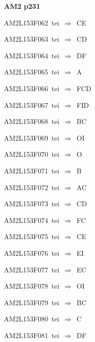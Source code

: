 \par\vfill\eject
{\bf\hfill AM2 p231\hfill\hbox{}}\par\bigskip
{\sixrm AM2L153F062\ {\sixit tei}\ }$\Rightarrow$\ CE\par\smallskip
{\sixrm AM2L153F063\ {\sixit tei}\ }$\Rightarrow$\ CD\par\smallskip
{\sixrm AM2L153F064\ {\sixit tei}\ }$\Rightarrow$\ DF\par\smallskip
{\sixrm AM2L153F065\ {\sixit tei}\ }$\Rightarrow$\ A\par\smallskip
{\sixrm AM2L153F066\ {\sixit tei}\ }$\Rightarrow$\ FCD\par\smallskip
{\sixrm AM2L153F067\ {\sixit tei}\ }$\Rightarrow$\ FID\par\smallskip
{\sixrm AM2L153F068\ {\sixit tei}\ }$\Rightarrow$\ BC\par\smallskip
{\sixrm AM2L153F069\ {\sixit tei}\ }$\Rightarrow$\ OI\par\smallskip
{\sixrm AM2L153F070\ {\sixit tei}\ }$\Rightarrow$\ O\par\smallskip
{\sixrm AM2L153F071\ {\sixit tei}\ }$\Rightarrow$\ B\par\smallskip
{\sixrm AM2L153F072\ {\sixit tei}\ }$\Rightarrow$\ AC\par\smallskip
{\sixrm AM2L153F073\ {\sixit tei}\ }$\Rightarrow$\ CD\par\smallskip
{\sixrm AM2L153F074\ {\sixit tei}\ }$\Rightarrow$\ FC\par\smallskip
{\sixrm AM2L153F075\ {\sixit tei}\ }$\Rightarrow$\ CE\par\smallskip
{\sixrm AM2L153F076\ {\sixit tei}\ }$\Rightarrow$\ EI\par\smallskip
{\sixrm AM2L153F077\ {\sixit tei}\ }$\Rightarrow$\ EC\par\smallskip
{\sixrm AM2L153F078\ {\sixit tei}\ }$\Rightarrow$\ OI\par\smallskip
{\sixrm AM2L153F079\ {\sixit tei}\ }$\Rightarrow$\ BC\par\smallskip
{\sixrm AM2L153F080\ {\sixit tei}\ }$\Rightarrow$\ {\tenit C}\par\smallskip
{\sixrm AM2L153F081\ {\sixit tei}\ }$\Rightarrow$\ DF\par\smallskip

